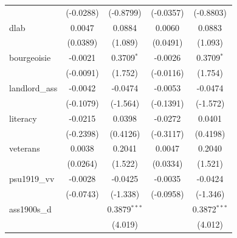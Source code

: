 \begin{table}[htbp]
\begin{tabular}{lcccc}
                                       & (-0.0288)             & (-0.8799)                     & (-0.0357)            & (-0.8803)\\   
      dlab                             & 0.0047                & 0.0884                        & 0.0060               & 0.0883\\   
                                       & (0.0389)              & (1.089)                       & (0.0491)             & (1.093)\\   
      bourgeoisie                      & -0.0021               & 0.3709$^{*}$                  & -0.0026              & 0.3709$^{*}$\\   
                                       & (-0.0091)             & (1.752)                       & (-0.0116)            & (1.754)\\   
      landlord\_ass                    & -0.0042               & -0.0474                       & -0.0053              & -0.0474\\   
                                       & (-0.1079)             & (-1.564)                      & (-0.1391)            & (-1.572)\\   
      literacy                         & -0.0215               & 0.0398                        & -0.0272              & 0.0401\\   
                                       & (-0.2398)             & (0.4126)                      & (-0.3117)            & (0.4198)\\   
      veterans                         & 0.0038                & 0.2041                        & 0.0047               & 0.2040\\   
                                       & (0.0264)              & (1.522)                       & (0.0334)             & (1.521)\\   
      psu1919\_vv                      & -0.0028               & -0.0425                       & -0.0035              & -0.0424\\   
                                       & (-0.0743)             & (-1.338)                      & (-0.0958)            & (-1.346)\\   
      ass1900s\_d                      &                       & 0.3879$^{***}$                &                      & 0.3872$^{***}$\\   
                                       &                       & (4.019)                       &                      & (4.012)\\   

\end{tabular}
\end{table}
